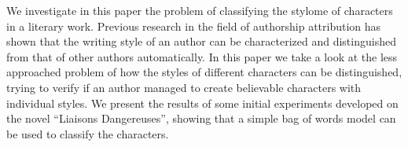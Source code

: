 We investigate in this paper the problem of classifying the stylome of characters in a literary work. Previous research in the field of authorship attribution has shown that the writing style of an author can be characterized and distinguished from that of other authors automatically. In this paper we take a look at the less approached problem of how the styles of different characters can be distinguished, trying to verify if an author managed to create believable characters with individual styles. We present the results of some initial experiments developed on the novel ``Liaisons Dangereuses'', showing that a simple bag of words model can be used to classify the characters.
